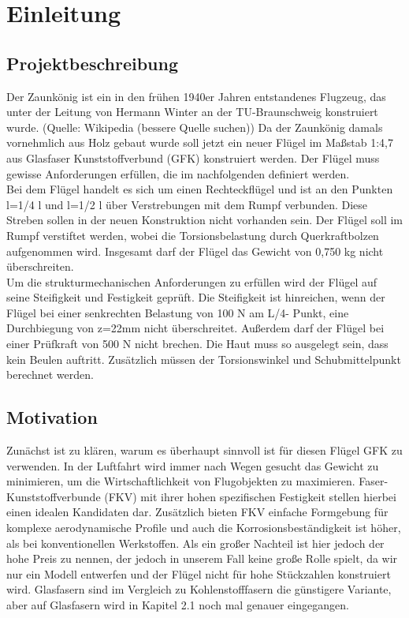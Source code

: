 \documentclass[a4paper,12p]{article}
\begin{document}
\tableofcontents
\section{Einleitung}
\subsection{Projektbeschreibung}
Der Zaunkönig ist ein in den frühen 1940er Jahren entstandenes Flugzeug, das unter der Leitung von Hermann Winter an der TU-Braunschweig konstruiert wurde. (Quelle: Wikipedia (bessere Quelle suchen)) Da der Zaunkönig damals vornehmlich aus Holz gebaut wurde soll jetzt ein neuer Flügel im Maßstab 1:4,7 aus Glasfaser Kunststoffverbund (GFK) konstruiert werden. Der Flügel muss gewisse Anforderungen erfüllen, die im nachfolgenden definiert werden.\\
Bei dem Flügel handelt es sich um einen Rechteckflügel und ist an den Punkten l=1/4 l und l=1/2 l über Verstrebungen mit dem Rumpf verbunden. Diese Streben sollen in der neuen Konstruktion nicht vorhanden sein. Der Flügel soll im Rumpf verstiftet werden, wobei die Torsionsbelastung durch Querkraftbolzen aufgenommen wird. Insgesamt darf der Flügel das Gewicht von 0,750 kg nicht überschreiten.\\
Um die strukturmechanischen Anforderungen zu erfüllen wird der Flügel auf seine Steifigkeit und Festigkeit geprüft. Die Steifigkeit ist hinreichen, wenn der Flügel bei einer senkrechten Belastung von 100 N am L/4- Punkt, eine Durchbiegung von z=22mm nicht überschreitet. Außerdem darf der Flügel bei einer Prüfkraft von 500 N nicht brechen. Die Haut muss so ausgelegt sein, dass kein Beulen auftritt. Zusätzlich müssen der Torsionswinkel und Schubmittelpunkt berechnet werden.

\subsection{Motivation}
Zunächst ist zu klären, warum es überhaupt sinnvoll ist für diesen Flügel GFK zu verwenden. In der Luftfahrt wird immer nach Wegen gesucht das Gewicht zu minimieren, um die Wirtschaftlichkeit von Flugobjekten zu maximieren. Faser-Kunststoffverbunde (FKV) mit ihrer hohen spezifischen Festigkeit stellen hierbei einen idealen Kandidaten dar. Zusätzlich bieten FKV einfache Formgebung für komplexe aerodynamische Profile und auch die Korrosionsbeständigkeit ist höher, als bei konventionellen Werkstoffen. Als ein großer Nachteil ist hier jedoch der hohe Preis zu nennen, der jedoch in unserem Fall keine große Rolle spielt, da wir nur ein Modell entwerfen und der Flügel nicht für hohe Stückzahlen konstruiert wird. Glasfasern sind im Vergleich zu Kohlenstofffasern die günstigere Variante, aber auf Glasfasern wird in Kapitel 2.1 noch mal genauer eingegangen.
\end{document}
